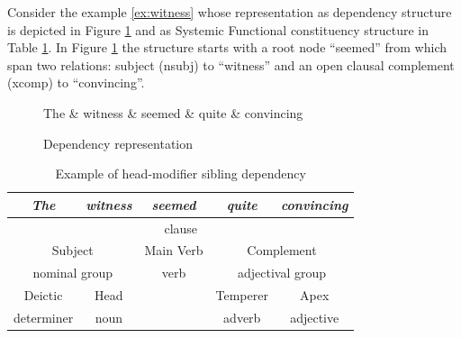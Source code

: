 Consider the example \ref{ex:witness} whose representation as dependency structure is depicted in Figure \ref{fig:dependency-dg-ex} and as Systemic Functional constituency structure in Table \ref{tab:dependency-sfg-ex}. In Figure \ref{fig:dependency-dg-ex} the structure starts with a root node ``seemed'' from which span two relations: subject (nsubj) to ``witness'' and an open clausal complement (xcomp) to ``convincing''.

\begin{figure}[!ht]
    \centering
    \begin{dependency}
        \begin{deptext}[]
            The \& witness \& seemed \& quite \& convincing\\ 
        \end{deptext}
    \end{dependency}
    \caption{Dependency representation } %
    \label{fig:dependency-dg-ex}
\end{figure}

\begin{table}[!ht]
    \centering
    \begin{tabular}{|c|c|c|c|c|}
        \hline
        \textit{The}   & \textit{witness}   & \textit{seemed} & \textit{quite}  & \textit{convincing} \\ \hline
        \multicolumn{5}{|c|}{clause}                                                                  \\ \hline
        \multicolumn{2}{|c|}{Subject}       & Main Verb       & \multicolumn{2}{c|}{Complement}       \\ \hline
        \multicolumn{2}{|c|}{nominal group} & verb            & \multicolumn{2}{c|}{adjectival group} \\ \hline
        Deictic        & Head              &                 & Temperer        & Apex                \\ \cline{1-2} \cline{4-5} 
        determiner     & noun               &                 & adverb          & adjective           \\ \cline{1-2} \cline{4-5} 
    \end{tabular}
    \caption{Example of head-modifier sibling dependency}
    \label{tab:dependency-sfg-ex}
\end{table}

